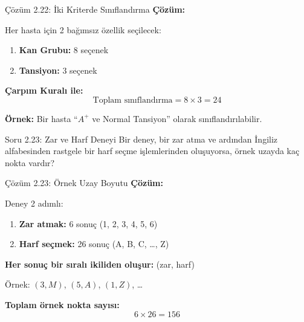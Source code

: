 \documentclass[light]{lutbeamer}
\begin{document}
\begin{frame}{Çözüm 2.22: İki Kriterde Sınıflandırma}
    \color{blue}
    \textbf{Çözüm:}
    
    Her hasta için 2 bağımsız özellik seçilecek:
    \begin{enumerate}
        \item \textbf{Kan Grubu:} 8 seçenek
        \item \textbf{Tansiyon:} 3 seçenek
    \end{enumerate}
    
    \vspace{0.3cm}
    \textbf{Çarpım Kuralı ile:}
    \[ \text{Toplam sınıflandırma} = 8 \times 3 = 24 \]
    
    \vspace{0.3cm}
    \textbf{Örnek:} Bir hasta ``$A^+$ ve Normal Tansiyon'' olarak sınıflandırılabilir.
    
    \begin{center}
    \end{center}
\end{frame}

\begin{frame}{Soru 2.23: Zar ve Harf Deneyi}
    Bir deney, bir zar atma ve ardından İngiliz alfabesinden rastgele bir harf seçme işlemlerinden oluşuyorsa, örnek uzayda kaç nokta vardır?
\end{frame}

\begin{frame}{Çözüm 2.23: Örnek Uzay Boyutu}
    \color{blue}
    \textbf{Çözüm:}
    
    Deney 2 adımlı:
    \begin{enumerate}
        \item \textbf{Zar atmak:} 6 sonuç (1, 2, 3, 4, 5, 6)
        \item \textbf{Harf seçmek:} 26 sonuç (A, B, C, \ldots, Z)
    \end{enumerate}
    
    \vspace{0.3cm}
    \textbf{Her sonuç bir sıralı ikiliden oluşur:} (zar, harf)
    
    Örnek: $(3, M)$, $(5, A)$, $(1, Z)$, \ldots
    
    \vspace{0.3cm}
    \textbf{Toplam örnek nokta sayısı:}
    \[ 6 \times 26 = 156 \]
    
    \begin{center}
    \end{center}
\end{frame}
\end{document}
